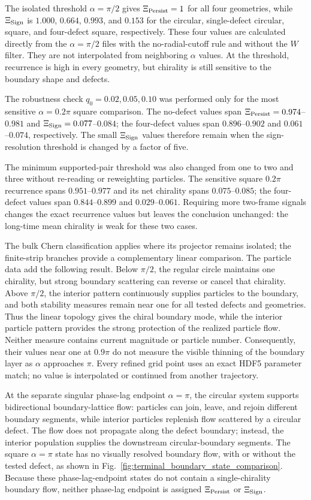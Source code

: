 \documentclass[11pt]{article}
\numberwithin{equation}{section}
\begin{document}
The isolated threshold $\alpha=\pi/2$ gives $\Xi_{\rm Persist}=1$ for all four
geometries, while $\Xi_{\rm Sign}$ is $1.000$, $0.664$, $0.993$, and $0.153$
for the circular, single-defect circular, square, and four-defect square,
respectively.  These four values are calculated directly from the
$\alpha=\pi/2$ files with the no-radial-cutoff rule and without the $W$ filter.
They are not interpolated from neighboring $\alpha$ values.  At the threshold,
recurrence is high in every geometry, but chirality is still sensitive to the
boundary shape and defects.

The robustness check $q_0=0.02,0.05,0.10$ was performed only for the most
sensitive $\alpha=0.2\pi$ square comparison.  The no-defect values span
$\Xi_{\rm Persist}=0.974$--$0.981$ and
$\Xi_{\rm Sign}=0.077$--$0.084$; the four-defect values span
$0.896$--$0.902$ and $0.061$--$0.074$, respectively.  The small
$\Xi_{\rm Sign}$ values therefore remain when the sign-resolution threshold is
changed by a factor of five.

The minimum supported-pair threshold was also changed from one to two and
three without re-reading or reweighting particles.  The sensitive square
$0.2\pi$ recurrence spans $0.951$--$0.977$ and its net chirality spans
$0.075$--$0.085$; the four-defect values span $0.844$--$0.899$ and
$0.029$--$0.061$.  Requiring more two-frame signals changes the exact
recurrence values but leaves the conclusion unchanged: the long-time mean
chirality is weak for these two cases.

The bulk Chern classification applies where its projector remains isolated;
the finite-strip branches provide a complementary linear comparison.
The particle data add the
following result.  Below $\pi/2$, the regular circle maintains one chirality,
but strong boundary scattering can reverse or cancel that chirality.  Above
$\pi/2$, the interior pattern continuously supplies particles to the boundary,
and both stability measures remain near one for all tested defects and
geometries.  Thus the linear topology gives the chiral boundary mode, while the
interior particle pattern provides the strong protection of the realized
particle flow.  Neither measure contains current magnitude or particle number.
Consequently, their values near one at $0.9\pi$ do not measure the visible
thinning of the boundary layer as $\alpha$ approaches $\pi$.  Every refined
grid point uses an exact HDF5 parameter match; no value is interpolated or
continued from another trajectory.

At the separate singular phase-lag endpoint $\alpha=\pi$, the circular system supports
bidirectional boundary-lattice flow: particles can join, leave, and rejoin
different boundary segments, while interior particles replenish flow scattered
by a circular defect.  The flow does not propagate along the defect boundary;
instead, the interior population supplies the downstream circular-boundary
segments.  The square $\alpha=\pi$ state has no visually resolved boundary flow, with or
without the tested defect, as shown in
Fig.~\ref{fig:terminal_boundary_state_comparison}.  Because these phase-lag-endpoint
states do not contain a single-chirality boundary flow, neither phase-lag endpoint is
assigned $\Xi_{\rm Persist}$ or $\Xi_{\rm Sign}$.
\end{document}
